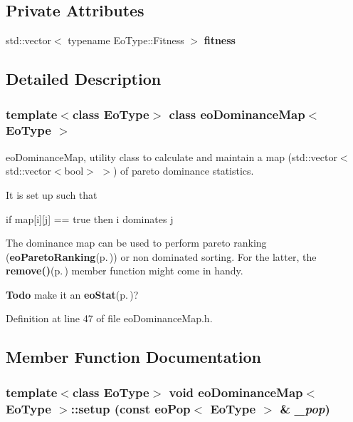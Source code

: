 \subsection*{Private Attributes}
\begin{CompactItemize}
\item 
std::vector$<$ typename Eo\-Type::Fitness $>$ {\bf fitness}\label{classeo_dominance_map_r0}

\end{CompactItemize}


\subsection{Detailed Description}
\subsubsection*{template$<$class Eo\-Type$>$ class eo\-Dominance\-Map$<$ Eo\-Type $>$}

eo\-Dominance\-Map, utility class to calculate and maintain a map (std::vector$<$std::vector$<$bool$>$ $>$) of pareto dominance statistics. 

It is set up such that

if map[i][j] == true then i dominates j

The dominance map can be used to perform pareto ranking ({\bf eo\-Pareto\-Ranking}{\rm (p.\,\pageref{classeo_pareto_ranking})}) or non dominated sorting. For the latter, the {\bf remove()}{\rm (p.\,\pageref{classeo_dominance_map_a2})} member function might come in handy.

\begin{Desc}
\item[{\bf Todo}]make it an {\bf eo\-Stat}{\rm (p.\,\pageref{classeo_stat})}? \end{Desc}




Definition at line 47 of file eo\-Dominance\-Map.h.

\subsection{Member Function Documentation}
\subsubsection{\setlength{\rightskip}{0pt plus 5cm}template$<$class Eo\-Type$>$ void {\bf eo\-Dominance\-Map}$<$ {\bf Eo\-Type} $>$::setup (const {\bf eo\-Pop}$<$ {\bf Eo\-Type} $>$ \& {\em \_\-pop})\hspace{0.3cm}{\tt  [inline]}}\label{classeo_dominance_map_a3}


